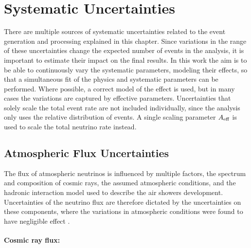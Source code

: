 


\section{Systematic Uncertainties} 

There are multiple sources of systematic uncertainties related to the event generation and processing explained in this chapter. Since variations in the range of these uncertainties change the expected number of events in the analysis, it is important to estimate their impact on the final results. In this work the aim is to be able to continuously vary the systematic parameters, modeling their effects, so that a simultaneous fit of the physics and systematic parameters can be performed. Where possible, a correct model of the effect is used, but in many cases the variations are captured by effective parameters. Uncertainties that solely scale the total event rate are not included individually, since the analysis only uses the relative distribution of events. A single scaling parameter $A_\rm{eff}$ is used to scale the total neutrino rate instead.


\subsection{Atmospheric Flux Uncertainties}

The flux of atmospheric neutrinos is influenced by multiple factors, the spectrum and composition of cosmic rays, the assumed atmospheric conditions, and the hadronic interaction model used to describe the air showers development. Uncertainties of the neutrino flux are therefore dictated by the uncertainties on these components, where the variations in atmospheric conditions were found to have negligible effect .


\paragraph{Cosmic ray flux:}

